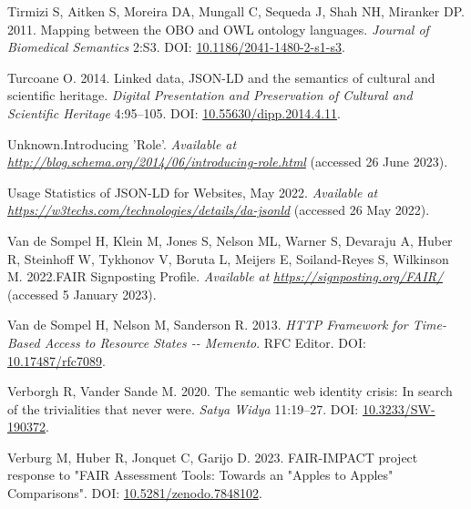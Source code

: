 \begin{CSLReferences}{1}{0}
\leavevmode{}%
Tirmizi S, Aitken S, Moreira DA, Mungall C, Sequeda J, Shah NH, Miranker DP. 2011. Mapping between the OBO and OWL ontology languages. \emph{Journal of Biomedical Semantics} 2:S3. DOI: \href{https://doi.org/10.1186/2041-1480-2-s1-s3}{10.1186/2041-1480-2-s1-s3}.

\leavevmode{}%
Turcoane O. 2014. Linked data, JSON-LD and the semantics of cultural and scientific heritage. \emph{Digital Presentation and Preservation of Cultural and Scientific Heritage} 4:95--105. DOI: \href{https://doi.org/10.55630/dipp.2014.4.11}{10.55630/dipp.2014.4.11}.

\leavevmode{}%
Unknown.Introducing 'Role'. \emph{Available at} \href{http://blog.schema.org/2014/06/introducing-role.html}{\emph{http://blog.schema.org/2014/06/introducing-role.html}} (accessed 26 June 2023).

\leavevmode{}%
Usage Statistics of JSON-LD for Websites, May 2022. \emph{Available at} \href{https://w3techs.com/technologies/details/da-jsonld}{\emph{https://w3techs.com/technologies/details/da-jsonld}} (accessed 26 May 2022).

\leavevmode{}%
Van de Sompel H, Klein M, Jones S, Nelson ML, Warner S, Devaraju A, Huber R, Steinhoff W, Tykhonov V, Boruta L, Meijers E, Soiland-Reyes S, Wilkinson M. 2022.FAIR Signposting Profile. \emph{Available at} \href{https://signposting.org/FAIR/}{\emph{https://signposting.org/FAIR/}} (accessed 5 January 2023).

\leavevmode{}%
Van de Sompel H, Nelson M, Sanderson R. 2013. \emph{HTTP Framework for Time-Based Access to Resource States -\/- Memento}. RFC Editor. DOI: \href{https://doi.org/10.17487/rfc7089}{10.17487/rfc7089}.

\leavevmode{}%
Verborgh R, Vander Sande M. 2020. The semantic web identity crisis: In search of the trivialities that never were. \emph{Satya Widya} 11:19--27. DOI: \href{https://doi.org/10.3233/SW-190372}{10.3233/SW-190372}.

\leavevmode{}%
Verburg M, Huber R, Jonquet C, Garijo D. 2023. FAIR-IMPACT project response to "FAIR Assessment Tools: Towards an "Apples to Apples" Comparisons". DOI: \href{https://doi.org/10.5281/zenodo.7848102}{10.5281/zenodo.7848102}.


\end{CSLReferences}
